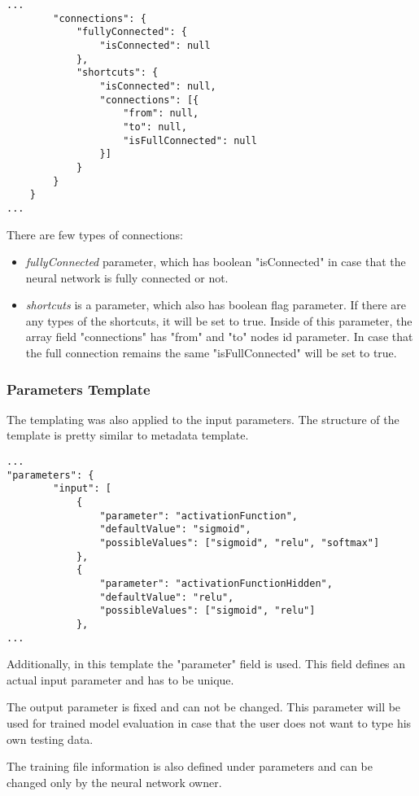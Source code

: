  \begin{lstlisting}[caption=ViNNSL template connections]
...
		"connections": {
			"fullyConnected": {
				"isConnected": null
			},
			"shortcuts": {
				"isConnected": null,
				"connections": [{
					"from": null,
					"to": null,
					"isFullConnected": null
				}]
			}
		}
	}
...
\end{lstlisting}

There are few types of connections:
\begin{itemize}
\item \emph{fullyConnected} parameter, which has boolean "isConnected" in case that the neural network is fully connected or not.
\item \emph{shortcuts} is a parameter, which also has boolean flag parameter. If there are any types of the shortcuts, it will be set to true. Inside of this parameter, the array field "connections" has "from" and "to" nodes id parameter. In case that the full connection remains the same "isFullConnected" will be set to true.
\end{itemize}

\subsubsection{Parameters Template}\label{Parameters Template}

 The templating was also applied to the input parameters. The structure of the template is pretty similar to metadata template.

 \begin{lstlisting}[caption=ViNNSL template input parameters]
...
"parameters": {
		"input": [
			{
				"parameter": "activationFunction",
				"defaultValue": "sigmoid",
				"possibleValues": ["sigmoid", "relu", "softmax"]
			},
			{
				"parameter": "activationFunctionHidden",
				"defaultValue": "relu",
				"possibleValues": ["sigmoid", "relu"]
			},
...
\end{lstlisting}

Additionally, in this template the "parameter" field is used. This field defines an actual input parameter and has to be unique.

The output parameter is fixed and can not be changed. This parameter will be used for trained model evaluation in case that the user does not want to type his own testing data.

The training file information is also defined under parameters and can be changed only by the neural network owner.


